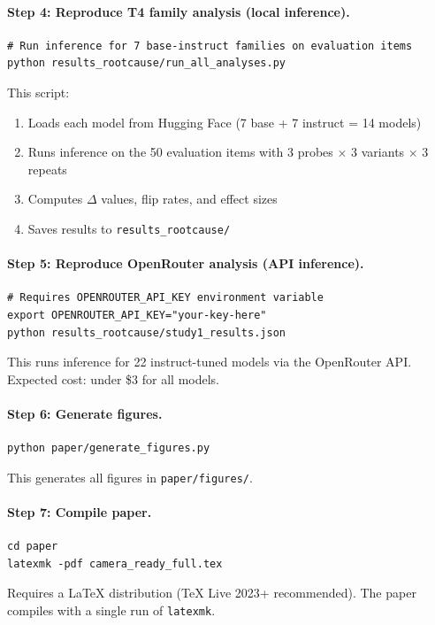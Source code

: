 \paragraph{Step 4: Reproduce T4 family analysis (local inference).}
\begin{verbatim}
# Run inference for 7 base-instruct families on evaluation items
python results_rootcause/run_all_analyses.py
\end{verbatim}
This script:
\begin{enumerate}
    \item Loads each model from Hugging Face (7 base + 7 instruct = 14 models)
    \item Runs inference on the 50 evaluation items with 3 probes $\times$ 3 variants $\times$ 3 repeats
    \item Computes $\Delta$ values, flip rates, and effect sizes
    \item Saves results to \texttt{results\_rootcause/}
\end{enumerate}

\paragraph{Step 5: Reproduce OpenRouter analysis (API inference).}
\begin{verbatim}
# Requires OPENROUTER_API_KEY environment variable
export OPENROUTER_API_KEY="your-key-here"
python results_rootcause/study1_results.json
\end{verbatim}
This runs inference for 22 instruct-tuned models via the OpenRouter API. Expected cost: under \$3 for all models.

\paragraph{Step 6: Generate figures.}
\begin{verbatim}
python paper/generate_figures.py
\end{verbatim}
This generates all figures in \texttt{paper/figures/}.

\paragraph{Step 7: Compile paper.}
\begin{verbatim}
cd paper
latexmk -pdf camera_ready_full.tex
\end{verbatim}
Requires a LaTeX distribution (TeX Live 2023+ recommended). The paper compiles with a single run of \texttt{latexmk}.

